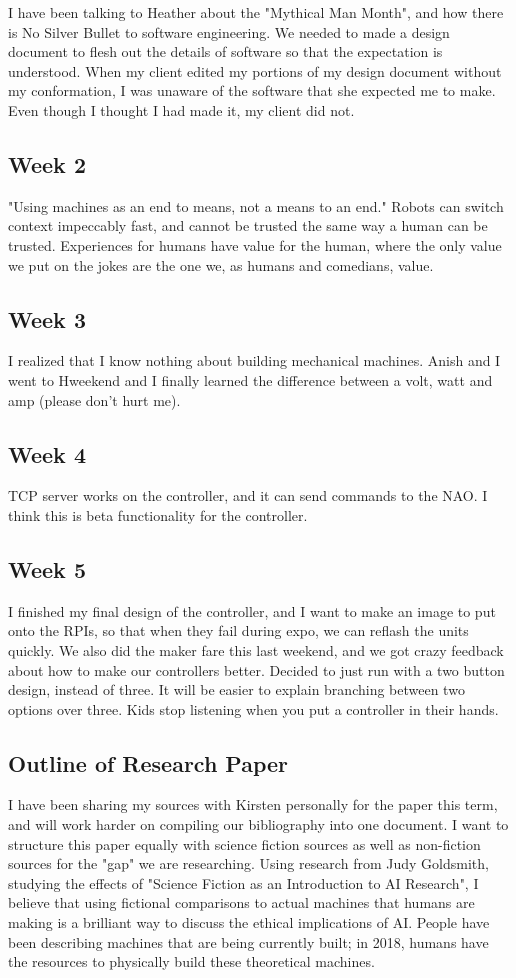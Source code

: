 \documentclass[onecolumn, draftclsnofoot,10pt, compsoc]{IEEEtran}
\begin{document}
I have been talking to Heather about the "Mythical Man Month", and how there is No Silver Bullet to software engineering. We needed to made a design document to flesh out the details of software so that the expectation is understood. When my client edited my portions of my design document without my conformation, I was unaware of the software that she expected me to make. Even though I thought I had made it, my client did not.

\subsection{Week 2} "Using machines as an end to means, not a means to an end." Robots can switch context impeccably fast, and cannot be trusted the same way a human can be trusted. Experiences for humans have value for the human, where the only value we put on the jokes are the one we, as humans and comedians, value.

\subsection{Week 3} I realized that I know nothing about building mechanical machines. Anish and I went to Hweekend and I finally learned the difference between a volt, watt and amp (please don't hurt me).

\subsection{Week 4} TCP server works on the controller, and it can send commands to the NAO. I think this is beta functionality for the controller.

\subsection{Week 5} I finished my final design of the controller, and I want to make an image to put onto the RPIs, so that when they fail during expo, we can reflash the units quickly. We also did the maker fare this last weekend, and we got crazy feedback about how to make our controllers better. Decided to just run with a two button design, instead of three. It will be easier to explain branching between two options over three. Kids stop listening when you put a controller in their hands.

\subsection{Outline of Research Paper}
	I have been sharing my sources with Kirsten personally for the paper this term, and will work harder on compiling our bibliography into one document. I want to structure this paper equally with science fiction sources as well as non-fiction sources for the "gap" we are researching. Using research from Judy Goldsmith, studying the effects of "Science Fiction as an Introduction to AI Research", I believe that using fictional comparisons to actual machines that humans are making is a brilliant way to discuss the ethical implications of AI. People have been describing machines that are being currently built; in 2018, humans have the resources to physically build these theoretical machines.
\end{document}
